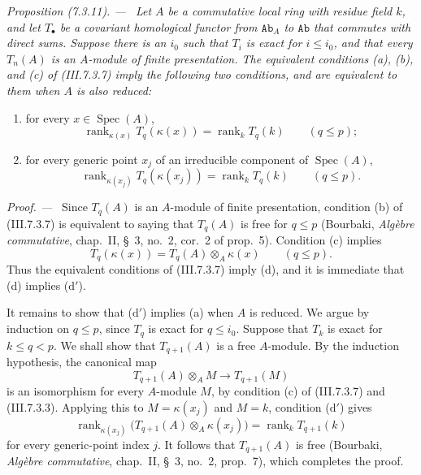 \documentclass[10pt,oneside]{book}
\newcommand{\cat}[1]{\mathtt{#1}}
\newcommand{\kres}{\kappa}
\newcommand{\Spec}{\operatorname{Spec}}
\newcommand{\sref}[2][]{(#2)}
\newenvironment{proposition}[1][]{\par\medskip\noindent\itshape Proposition (#1). ---\ }{\par}
\newenvironment{proof}{\par\medskip\noindent\textit{Proof. ---\ }}{\par}
\begin{document}
\begin{proposition}[7.3.11]
\label{III.7.3.11}
Let $A$ be a commutative local ring with residue field $k$,
and let $T_\bullet$ be a covariant homological functor from
$\cat{Ab}_A$ to $\cat{Ab}$ that commutes with direct sums.
Suppose there is an $i_0$ such that $T_i$ is exact for
$i\leq i_0$, and that every $T_n(A)$ is an $A$-module of
finite presentation.  The equivalent conditions (a), (b), and
(c) of \sref{III.7.3.7} imply the following two conditions,
and are equivalent to them when $A$ is also reduced:
\begin{enumerate}
  \item[(d)] for every $x\in\Spec(A)$,
    \[
      \operatorname{rank}_{\kres(x)}
      T_q(\kres(x))
      =
      \operatorname{rank}_k T_q(k)
      \qquad(q\leq p);
    \]
  \item[($\mathrm{d}'$)] for every generic point $x_j$ of an
    irreducible component of $\Spec(A)$,
    \[
      \operatorname{rank}_{\kres(x_j)}
      T_q(\kres(x_j))
      =
      \operatorname{rank}_k T_q(k)
      \qquad(q\leq p).
    \]
\end{enumerate}
\end{proposition}

\begin{proof}
Since $T_q(A)$ is an $A$-module of finite presentation,
condition (b) of \sref{III.7.3.7} is equivalent to saying that
$T_q(A)$ is free for $q\leq p$ (Bourbaki,
\emph{Alg\`ebre commutative}, chap.~II, \S~3, no.~2, cor.~2
of prop.~5).  Condition (c) implies
\[
  T_q(\kres(x))
  =
  T_q(A)\otimes_A\kres(x)
  \qquad(q\leq p).
\]
Thus the equivalent conditions of \sref{III.7.3.7} imply (d),
and it is immediate that (d) implies ($\mathrm{d}'$).

It remains to show that ($\mathrm{d}'$) implies (a) when $A$ is
reduced.  We argue by induction on $q\leq p$, since $T_q$ is
exact for $q\leq i_0$.  Suppose that $T_k$ is exact for
$k\leq q<p$.  We shall show that $T_{q+1}(A)$ is a free
$A$-module.  By the induction hypothesis, the canonical map
\[
  T_{q+1}(A)\otimes_A M
  \longrightarrow
  T_{q+1}(M)
\]
is an isomorphism for every $A$-module $M$, by condition (c) of
\sref{III.7.3.7} and \sref{III.7.3.3}.  Applying this to
$M=\kres(x_j)$ and $M=k$, condition ($\mathrm{d}'$) gives
\[
  \operatorname{rank}_{\kres(x_j)}
  \bigl(T_{q+1}(A)\otimes_A\kres(x_j)\bigr)
  =
  \operatorname{rank}_k T_{q+1}(k)
\]
for every generic-point index $j$.  It follows that
$T_{q+1}(A)$ is free (Bourbaki,
\emph{Alg\`ebre commutative}, chap.~II, \S~3, no.~2, prop.~7),
which completes the proof.
\end{proof}
\end{document}
